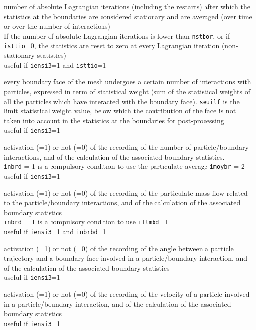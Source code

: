 {number of absolute Lagrangian iterations (including the restarts)
after which the statistics at the boundaries are considered stationary and are
averaged (over time or over the number of interactions)\\
If the number of absolute Lagrangian iterations is lower than \texttt{nstbor},
or if \texttt{isttio}=0, the statistics are reset to zero at every
Lagrangian iteration (non-stationary statistics)\\
useful if \texttt{iensi3}=1 and \texttt{isttio}=1}

{every boundary face of the mesh undergoes a certain number of
interactions with particles, expressed in term of statistical weight
(sum of the statistical weights of all the particles which have
interacted with the boundary face). \texttt{seuilf} is
the limit statistical weight value, below which the contribution of the
face is not taken into account in the
statistics at the boundaries for post-processing\\
useful if \texttt{iensi3}=1}

{activation (=1) or not (=0) of the recording of the number of particle/boundary
interactions, and of the calculation of the associated boundary statistics.\\
\texttt{inbrd} = 1 is a compulsory condition to use the particulate average
\texttt{imoybr} = 2\\
useful if \texttt{iensi3}=1}

{activation (=1) or not (=0) of the recording of the particulate mass flow
related to the particle/boundary interactions, and of the calculation of
the associated boundary statistics\\
\texttt{inbrd} = 1 is a compulsory condition to use \texttt{iflmbd}=1\\
useful if \texttt{iensi3}=1 and \texttt{inbrbd}=1}


{activation (=1) or not (=0) of the recording of the angle between a
particle trajectory and a boundary face involved in a particle/boundary
interaction, and of the calculation of the associated boundary statistics\\
useful if \texttt{iensi3}=1}

{activation (=1) or not (=0) of the recording of the velocity of a particle
involved in a particle/boundary interaction, and of the calculation of
the associated boundary statistics\\
useful if \texttt{iensi3}=1}

